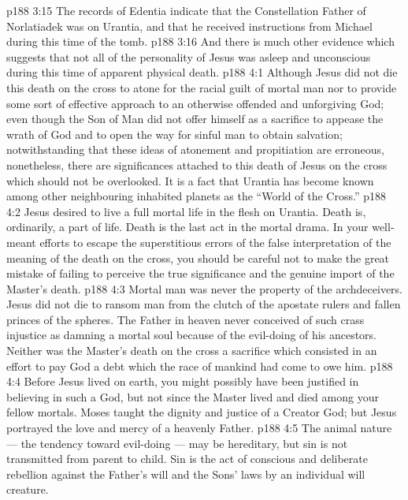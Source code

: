 \vs p188 3:15 The records of Edentia indicate that the Constellation Father of Norlatiadek was on Urantia, and that he received instructions from Michael during this time of the tomb.
\vs p188 3:16 And there is much other evidence which suggests that not all of the personality of Jesus was asleep and unconscious during this time of apparent physical death.
\vs p188 4:1 Although Jesus did not die this death on the cross to atone for the racial guilt of mortal man nor to provide some sort of effective approach to an otherwise offended and unforgiving God; even though the Son of Man did not offer himself as a sacrifice to appease the wrath of God and to open the way for sinful man to obtain salvation; notwithstanding that these ideas of atonement and propitiation are erroneous, nonetheless, there are significances attached to this death of Jesus on the cross which should not be overlooked. It is a fact that Urantia has become known among other neighbouring inhabited planets as the “World of the Cross.”
\vs p188 4:2 Jesus desired to live a full mortal life in the flesh on Urantia. Death is, ordinarily, a part of life. Death is the last act in the mortal drama. In your well\hyp{}meant efforts to escape the superstitious errors of the false interpretation of the meaning of the death on the cross, you should be careful not to make the great mistake of failing to perceive the true significance and the genuine import of the Master’s death.
\vs p188 4:3 \pc Mortal man was never the property of the archdeceivers. Jesus did not die to ransom man from the clutch of the apostate rulers and fallen princes of the spheres. The Father in heaven never conceived of such crass injustice as damning a mortal soul because of the evil\hyp{}doing of his ancestors. Neither was the Master’s death on the cross a sacrifice which consisted in an effort to pay God a debt which the race of mankind had come to owe him.
\vs p188 4:4 Before Jesus lived on earth, you might possibly have been justified in believing in such a God, but not since the Master lived and died among your fellow mortals. Moses taught the dignity and justice of a Creator God; but Jesus portrayed the love and mercy of a heavenly Father.
\vs p188 4:5 The animal nature --- the tendency toward evil\hyp{}doing --- may be hereditary, but sin is not transmitted from parent to child. Sin is the act of conscious and deliberate rebellion against the Father’s will and the Sons’ laws by an individual will creature.
